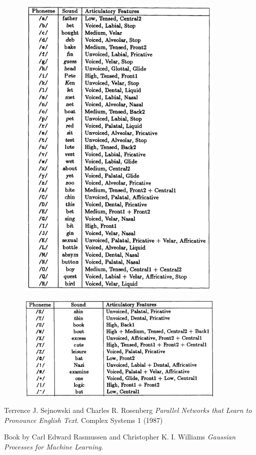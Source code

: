 \documentclass[paper=a4, fontsize=11pt]{scrartcl} %
\numberwithin{equation}{section} %
\numberwithin{figure}{section} %
\numberwithin{table}{section} %
\begin{document}
\begin{center}
\begin{figure}[h!]
\centering
\includegraphics[width=100mm]{art_features.jpg}
\end{figure}
\end{center}

\begin{center}
\begin{figure}[h!]
\centering

\includegraphics[width=100mm]{art_features2.jpg}
\end{figure}
\end{center}



\begin{thebibliography}{9}
Terrence J. Sejnowski and Charles R. Rosenberg
\textit{Parallel Networks that Learn to Pronounce English Text}. 
Complex Systems 1 (1987)

Book by Carl Edward Rasmussen and Christopher K. I. Williams\textit{ Gaussian Processes for Machine Learning}. 



\end{thebibliography}
\end{document}
